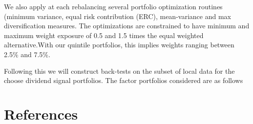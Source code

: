 \documentclass[11pt,preprint, authoryear]{elsarticle}
\numberwithin{equation}{section}
\numberwithin{figure}{section}
\numberwithin{table}{section}
\begin{document}
We also apply at each rebalancing several portfolio optimization
routines (minimum variance, equal risk contribution (ERC), mean-variance
and max diversification measures. The optimizations are constrained to
have minimum and maximum weight exposure of 0.5 and 1.5 times the equal
weighted alternative.With our quintile portfolios, this implies weights
ranging between 2.5\% and 7.5\%.

Following this we will construct back-tests on the subset of local data
for the choose dividend signal portfolios. The factor portfolios
considered are as follows

\newpage

\hypertarget{references}{%
\section*{References}\label{references}}
\end{document}
